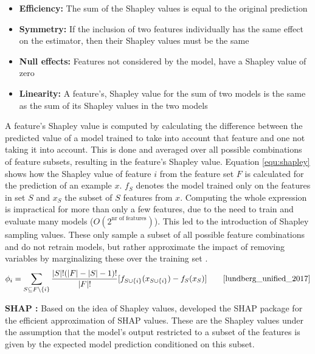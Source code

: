\documentclass[msc,deptreport,ai]{infthesis} %
\begin{document}
	\begin{itemize}
		\item \textbf{Efficiency:} The sum of the Shapley values is equal to the original prediction
		\item \textbf{Symmetry:} If the inclusion of two features individually has the same effect on the estimator, then their Shapley values must be the same
		\item \textbf{Null effects:} Features not considered by the model, have a Shapley value of zero
		\item \textbf{Linearity:} A feature's, Shapley value for the sum of two models is the same as the sum of its Shapley values in the two models
	\end{itemize}
	
	A feature's Shapley value is computed by calculating the difference between the predicted value of a model trained to take into account that feature and one not taking it into account. This is done and averaged over all possible combinations of feature subsets, resulting in the feature's Shapley value. Equation \ref{equ:shapley} shows how the Shapley value of feature $i$ from the feature set $F$ is calculated for the prediction of an example $x$. $f_S$ denotes the model trained only on the features in set $S$ and $x_S$ the subset of $S$ features from $x$. Computing the whole expression is impractical for more than only a few features, due to the need to train and evaluate many models ($O(2^{\textrm{nr of features}})$). This led to the introduction of Shapley sampling values. These only sample a subset of all possible feature combinations and do not retrain models, but rather approximate the  impact of removing variables by marginalizing these over the training set \cite{lundberg_unified_2017}.
	\begin{align} 
		\phi_{i} 	& = \sum_{S \subseteq F \symbol{92} \{i\} }  \frac{|S|!(|F| - |S| - 1)!}{|F|!} [f_{S \cup \{i\}}(x_{S \cup \{i\} }) - f_{S}(x_S)] \quad 		&  \textrm{\cite[equation 4]{lundberg_unified_2017}} \label{equ:shapley} %
	\end{align}
	
	\textbf{SHAP \cite{lundberg_unified_2017}:} Based on the idea of Shapley values, \citeauthor{lundberg_unified_2017} \cite{lundberg_unified_2017} developed the \gls{SHAP} package for the efficient approximation of \gls{SHAP} values. These are the Shapley values under the assumption that the model's output restricted to a subset of the features is given by the expected model prediction conditioned on this subset. 
\end{document}
